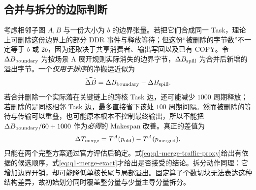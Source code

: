 \subsection{合并与拆分的边际判断}
考虑相邻子图 $A,B$ 与一份大小为 $b$ 的边界张量。若把它们合成同一 Task，理论上可删除这份边界上的部分 DDR 事件与释放等待；但这份“被删除的字节数”不一定等于 $b$ 或 $2b$，因为还取决于共享消费者、输出写回以及已有 COPY。令 $\Delta B_{\rm boundary}$ 为按场景 A 展开规则实际消失的边界字节，$\Delta B_{\rm spill}$ 为合并后新增的溢出字节。一个\emph{仅用于排序}的净搬运近似为
\begin{equation}\label{eq:q1-merge-traffic-proxy}
\widehat{\Delta B}
=\Delta B_{\rm boundary}-\Delta B_{\rm spill}.
\end{equation}
若合并删除一个实际落在关键链上的跨核 Task 边，还可能减少 $1000$ 周期释放；若删除的是同核相邻 Task 边，最多直接省下该处 $100$ 周期间隔。然而被删除的等待与传输可以重叠，也可能原本根本不控制最终输出，所以不能把 $\Delta B_{\rm boundary}/60+1000$ 作为\emph{必得}的 Makespan 改善。真正的差值为
\begin{equation}\label{eq:q1-merge-exact}
\Delta T_{\rm merge}
=T^A(p_{\rm old})-T^A(p_{\rm merged}),
\end{equation}
只能在两个完整方案通过官方评估后确定。式\eqref{eq:q1-merge-traffic-proxy}给出有依据的候选顺序，式\eqref{eq:q1-merge-exact}才给出是否接受的结论。拆分动作同理：它增加边界开销，却可能降低单核长尾与局部溢出。固定算子个数切块无法表达这种结构差异，故初始划分同时覆盖整分量与少量主导分量拆分。
